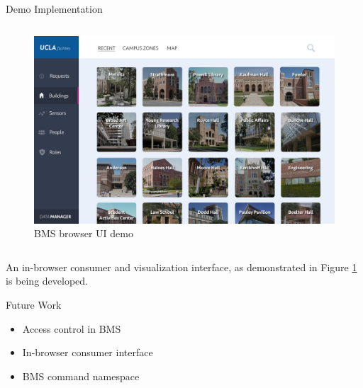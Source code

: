 \documentclass[final,hyperref={pdfpagelabels=false},16pt]{beamer}
\begin{document}
\begin{frame}[t]
\begin{columns}[t]
\begin{column}{.465\textwidth}
\begin{block}{Demo Implementation}
\begin{columns}[T]
\begin{column}{.51\textwidth}
\begin{figure}
\includegraphics[width=\linewidth]{bms-ui-demo.png}
\caption{BMS browser UI demo}
\label{fig:bms-ui}
\end{figure}
\end{column}

\end{columns}

\vspace{10mm}

An in-browser consumer and visualization interface, as demonstrated in Figure \ref{fig:bms-ui} is being developed.

\vspace{10mm}

\end{block}


\begin{block}{Future Work}
\begin{itemize}
\item Access control in BMS
\item In-browser consumer interface
\item BMS command namespace
\end{itemize}
\end{block}



\end{column}
\end{columns}
\end{frame}
\end{document}
